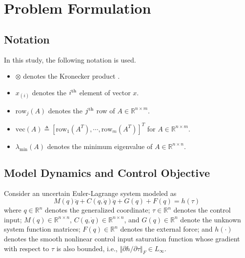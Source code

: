 \documentclass[lettersize,journal]{IEEEtran}
\begin{document}
\section{Problem Formulation}\label{sec: Problem Formulation}

\subsection{Notation}
In this study, the following notation is used.

\begin{itemize}
    \item $\otimes$ denotes the Kronecker product \cite{RN17}.
    \item $x_{(i)}$ denotes the $i\textsuperscript{th}$ element of vector $x$.    
    \item $\text{row}_j(A)$ denotes the $j\textsuperscript{th}$ row of $A\in\mathbb{R}^{n\times m}$. 
    \item $\text{vec}(A)\triangleq [\text{row}_1(A^T)  ,\cdots,\text{row}_m(A^T)  ]^T   $ for $A\in\mathbb{R}^{n\times m}$.
    \item $\lambda_\text{min}(A)$ denotes the minimum eigenvalue of $A\in\mathbb{R}^{n\times n}$.
\end{itemize}

\subsection{Model Dynamics and Control Objective}

Consider an uncertain Euler-Lagrange system modeled as
\begin{equation}
    M(q)\ddot q + C(q,\dot q)\dot q + G(q) + F(q) = h(\tau)
    \label{eq. system dynamics 1}
\end{equation}
where $q\in \mathbb{R}^n$ denotes the generalized coordinate; $\tau\in\mathbb{R}^n$ denotes the control input; $M(q)\in\mathbb{R}^{n\times n}$, $C(q,\dot q)\in\mathbb{R}^{n\times n}$, and $G(q)\in\mathbb{R}^{n}$ denote the unknown system function matrices; $F(q)\in\mathbb{R}^{n}$ denotes the external force; and $h(\cdot)$ denotes the smooth nonlinear control input saturation function whose gradient with respect to $\tau$ is also bounded, i.e., $\Vert\partial h/\partial \tau\Vert_F\in L_\infty$. 
\end{document}
